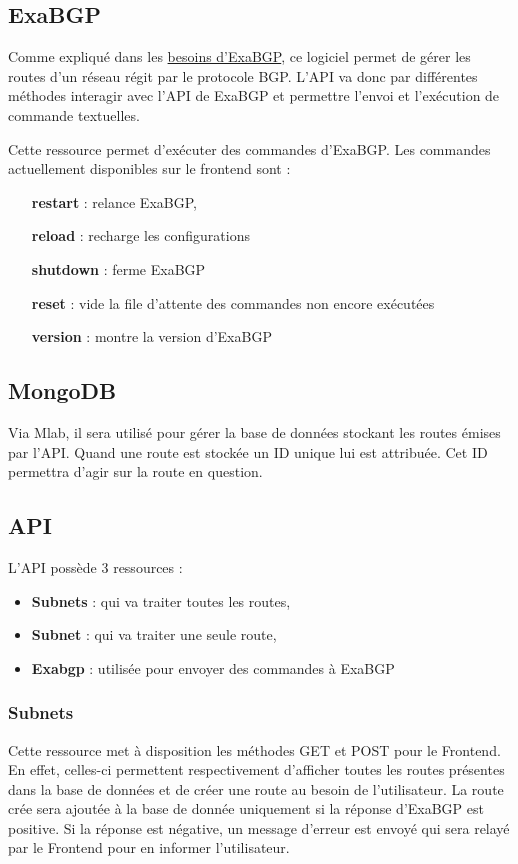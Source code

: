 \subsection{ExaBGP}
Comme expliqué dans les \hyperref[sssec:exabgp]{besoins d'ExaBGP}, ce logiciel permet de gérer les routes d'un réseau régit par le protocole BGP.
L'API va donc par différentes méthodes interagir avec l'API de ExaBGP et permettre l'envoi et l'exécution de commande textuelles.

Cette ressource permet d'exécuter des commandes d'ExaBGP. Les commandes actuellement disponibles sur le frontend sont :
\begin{itemize}
    \item [\textbf{restart}] : relance ExaBGP,
    \item [\textbf{reload}] : recharge les configurations
    \item [\textbf{shutdown}] : ferme ExaBGP
    \item [\textbf{reset}] : vide la file d'attente des commandes non encore exécutées
    \item [\textbf{version}] : montre la version d'ExaBGP
\end{itemize}

\subsection{MongoDB}
Via Mlab, il sera utilisé pour gérer la base de données stockant les routes émises par l'API.
Quand une route est stockée un ID unique lui est attribuée. Cet ID permettra d'agir sur la route en question.

\subsection{API}
L'API possède 3 ressources :
\begin{itemize}
    \item \textbf{Subnets} : qui va traiter toutes les routes,
    \item \textbf{Subnet} : qui va traiter une seule route,
    \item \textbf{Exabgp} : utilisée pour envoyer des commandes à ExaBGP
\end{itemize}
\subsubsection{Subnets}
Cette ressource met à disposition les méthodes GET et POST pour le Frontend. En effet, celles-ci permettent respectivement d'afficher toutes les routes présentes dans la base de données et de créer une route au besoin de l'utilisateur. La route crée sera ajoutée à la base de donnée uniquement si la réponse d'ExaBGP est positive.
Si la réponse est négative, un message d'erreur est envoyé qui sera relayé par le Frontend pour en informer l'utilisateur.

